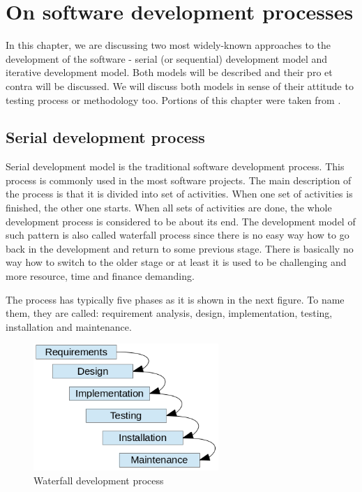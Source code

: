\documentclass[12pt,final,oneside]{fithesis}
\begin{document}
\chapter{On software development processes}

In this chapter, we are discussing two most widely-known approaches to the development of the software - serial (or sequential) development model and iterative development model. Both models will be described and their pro et contra will be discussed. We will discuss both models in sense of their attitude to testing process or methodology too. Portions of this chapter were taken from \cite{jenniferDorette}.

	\section{Serial development process}
	
Serial development model is the traditional software development process. This process is commonly used in the most software projects. The main description of the process is that it is divided into set of activities. When one set of activities is finished, the other one starts. When all sets of activities are done, the whole development process is considered to be about its end. The development model of such pattern is also called waterfall process since there is no easy way how to go back in the development and return to some previous stage. There is basically no way how to switch to the older stage or at least it is used to be challenging and more resource, time and finance demanding.

The process has typically five phases as it is shown in the next figure. To name them, they are called: requirement analysis, design, implementation, testing, installation and maintenance.\\

\begin{figure}
	\centering
	\includegraphics[width=70mm]{img/waterfall.png}
	\caption{Waterfall development process}
	\label{fig:waterfall_process}
\end{figure}
\end{document}
